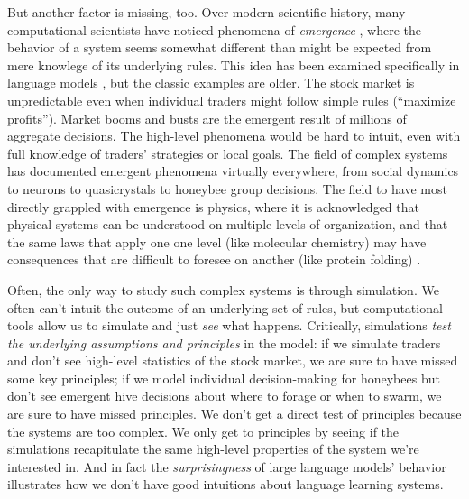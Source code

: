 \documentclass[output=paper,colorlinks,citecolor=brown
]{langscibook}
\begin{document}
But another factor is missing, too. Over modern scientific history, many computational scientists have noticed phenomena of \textit{emergence} \citep{goldstein1999emergence,mcclelland2010emergence}, where the behavior of a system seems somewhat different than might be expected from mere knowlege of its underlying rules. This idea has been examined specifically in language models \citep{wei2022emergent,manning2020emergent}, but the classic examples are older. The stock market is unpredictable even when individual traders might follow simple rules (``maximize profits''). Market booms and busts are the emergent result of millions of aggregate decisions. The high-level phenomena would be hard to intuit, even with full knowledge of traders' strategies or local goals. The field of complex systems has documented emergent phenomena virtually everywhere, from social dynamics to neurons to quasicrystals to honeybee group decisions. The field to have most directly grappled with emergence is physics, where it is acknowledged that physical systems can be understood on multiple levels of organization, and that the same laws that apply one one level (like molecular chemistry) may have consequences that are difficult to foresee on another (like protein folding) \citep{anderson1972more,crutchfield1994anything,crutchfield1994calculi}. 

Often, the only way to study such complex systems is through simulation. We often can't intuit the outcome of an underlying set of rules, but computational tools allow us to simulate and just \textit{see} what happens. Critically, simulations \textit{test the underlying assumptions and principles} in the model: if we simulate traders and don't see high-level statistics of the stock market, we are sure to have missed some key principles; if we model individual decision-making for honeybees but don't see emergent hive decisions about where to forage or when to swarm, we are sure to have missed principles. We don't get a direct test of principles because the systems are too complex. We only get to principles by seeing if the simulations recapitulate the same high-level properties of the system we're interested in. And in fact the \textit{surprisingness} of large language models' behavior illustrates how we don't have good intuitions about language learning systems. 

\end{document}
